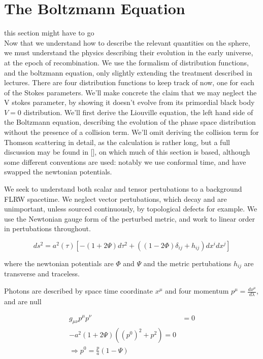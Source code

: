 \section{The Boltzmann Equation}

this section might have to go\\


Now that we understand how to describe the relevant quantities on the sphere, we must understand the physics describing their evolution in the early universe, at the epoch of recombination. We use the formalism of distribution functions, and the boltzmann equation, only slightly extending the treatment described in lectures. There are four distribution functions to keep track of now, one for each of the Stokes parameters. We'll make concrete the claim that we may neglect the V stokes parameter, by showing it doesn't evolve from its primordial black body $V=0$ distribution. We'll first derive the Liouville equation, the left hand side of the Boltzmann equation, describing the evolution of the phase space distribution without the presence of a collision term. We'll omit deriving the collision term for Thomson scattering in detail, as the calculation is rather long, but a full discussion may be found in [], on which much of this section is based, although some different conventions are used: notably we use conformal time, and have swapped the newtonian potentials.

We seek to understand both scalar and tensor pertubations to a background FLRW spacetime. We neglect vector pertubations, which decay and are unimportant, unless sourced continuously, by topological defects for example. We use the Newtonian gauge form of the perturbed metric, and work to linear order in pertubations throughout.

\begin{equation}
ds^2 = a^2(\tau) [-(1+2\Psi)d\tau^2 + ((1-2\Phi)\delta_{ij} +h_{ij})dx^idx^j]
\label{perturbmetric}
\end{equation}

where the newtonian potentials are $\Phi$ and $\Psi$ and the metric pertubations $h_{ij}$ are transverse and traceless. 


Photons are described by space time coordinate $x^\mu$ and four momentum $p^\mu=\frac{dx^\mu}{d\lambda}$, and are null

\begin{equation}\begin{split}
g_{\mu\nu}p^\mu p^\nu&=0\\
-a^2(1+2\Psi)((p^0)^2 + p^2) = 0\\
\Rightarrow p^0 = \frac{p}{a}(1-\Psi)
\end{split}\end{equation}

